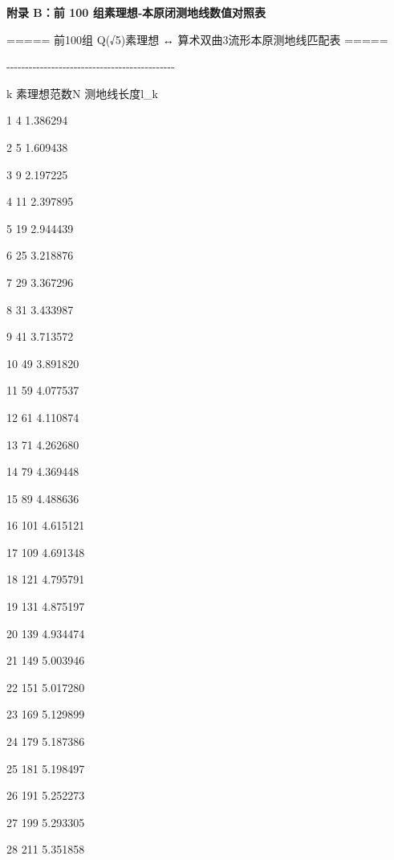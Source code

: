 \documentclass[12pt]{article}
\begin{document}
\textbf{附录 B：前 100 组素理想‑本原闭测地线数值对照表}

===== 前100组 Q(√5)素理想 ↔ 算术双曲3流形本原测地线匹配表 =====

-\/-\/-\/-\/-\/-\/-\/-\/-\/-\/-\/-\/-\/-\/-\/-\/-\/-\/-\/-\/-\/-\/-\/-\/-\/-\/-\/-\/-\/-\/-\/-\/-\/-\/-\/-\/-\/-\/-\/-\/-\/-\/-\/-\/-

k \textbar{} 素理想范数N \textbar{} 测地线长度l\_k

1 \textbar{} 4 \textbar{} 1.386294

2 \textbar{} 5 \textbar{} 1.609438

3 \textbar{} 9 \textbar{} 2.197225

4 \textbar{} 11 \textbar{} 2.397895

5 \textbar{} 19 \textbar{} 2.944439

6 \textbar{} 25 \textbar{} 3.218876

7 \textbar{} 29 \textbar{} 3.367296

8 \textbar{} 31 \textbar{} 3.433987

9 \textbar{} 41 \textbar{} 3.713572

10 \textbar{} 49 \textbar{} 3.891820

11 \textbar{} 59 \textbar{} 4.077537

12 \textbar{} 61 \textbar{} 4.110874

13 \textbar{} 71 \textbar{} 4.262680

14 \textbar{} 79 \textbar{} 4.369448

15 \textbar{} 89 \textbar{} 4.488636

16 \textbar{} 101 \textbar{} 4.615121

17 \textbar{} 109 \textbar{} 4.691348

18 \textbar{} 121 \textbar{} 4.795791

19 \textbar{} 131 \textbar{} 4.875197

20 \textbar{} 139 \textbar{} 4.934474

21 \textbar{} 149 \textbar{} 5.003946

22 \textbar{} 151 \textbar{} 5.017280

23 \textbar{} 169 \textbar{} 5.129899

24 \textbar{} 179 \textbar{} 5.187386

25 \textbar{} 181 \textbar{} 5.198497

26 \textbar{} 191 \textbar{} 5.252273

27 \textbar{} 199 \textbar{} 5.293305

28 \textbar{} 211 \textbar{} 5.351858
\end{document}
